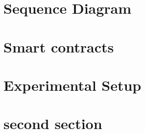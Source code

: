 \section{Sequence Diagram}
\section{Smart contracts}
\section{Experimental Setup} \label{sec:sectionlabel}
\section{second section}

